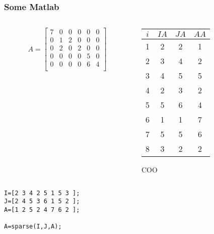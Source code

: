 \documentclass[10pt]{beamer}
\begin{document}
\begin{frame}
\frametitle{}
\begin{center}
\end{center}
\end{frame}
\begin{frame}[fragile]
\frametitle{Some Matlab}
\begin{columns}
  \begin{column}{0.48\textwidth}
    \begin{equation*}
  A = \begin{bmatrix}
  7 & 0 &0 &0 &0 &0\\
  0&1&2 &0&0&0\\
  0&2&0&2&0&0\\
  0&0&0&0&5&0\\
  0&0&0&0&6&4\\
  \end{bmatrix}
\end{equation*}
  \end{column}
  \begin{column}{0.48\textwidth}
    \begin{center}
    \begin{tabular}{c | c c c}
    $i$ & $IA$ & $JA$ & $AA$\\\hline
    1 & 2 & 2 & 1\\
    2 & 3 & 4 & 2\\
    3 & 4 & 5 & 5\\
    4 & 2 & 3 & 2\\
    5 & 5 & 6 & 4\\
    6 & 1 & 1 & 7\\
    7 & 5 & 5 & 6\\
    8 & 3 & 2 & 2\\
    \end{tabular}
    COO
    \end{center}
  \end{column}
\end{columns}
\begin{lstlisting}
I=[2 3 4 2 5 1 5 3 ];
J=[2 4 5 3 6 1 5 2 ];
A=[1 2 5 2 4 7 6 2 ];

A=sparse(I,J,A);
\end{lstlisting}
\end{frame}
\end{document}
